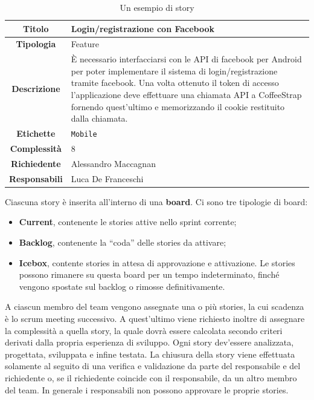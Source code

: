 \begin{center}
\begin{table}[htpd]
  \begin{tabularx}{\textwidth}{ | c | X |}
    \hline
    \textbf{Titolo} & Login/registrazione con Facebook \\
    \hline
    \textbf{Tipologia} & Feature \\
    \hline
    \textbf{Descrizione} & È necessario interfacciarsi con le API di facebook per Android per poter implementare il sistema di login/registrazione tramite facebook. Una volta ottenuto il token di accesso l'applicazione deve effettuare una chiamata API a CoffeeStrap fornendo quest'ultimo e memorizzando il cookie restituito dalla chiamata. \\
    \hline
    \textbf{Etichette} & \texttt{Mobile} \\
    \hline
    \textbf{Complessità} & 8 \\
    \hline
    \textbf{Richiedente} & Alessandro Maccagnan \\
    \hline
    \textbf{Responsabili} & Luca De Franceschi \\
    \hline
  \end{tabularx}
  \caption{Un esempio di story}
 \end{table}
\end{center}

Ciascuna story è inserita all'interno di una \textbf{board}. Ci sono tre tipologie di board:

\begin{itemize}

\item \textbf{Current}, contenente le stories attive nello sprint corrente;
\item \textbf{Backlog}, contenente la ``coda'' delle stories da attivare;
\item \textbf{Icebox}, contente stories in attesa di approvazione e attivazione. Le stories possono rimanere su questa board per un tempo indeterminato, finché vengono spostate sul backlog o rimosse definitivamente.

\end{itemize} 

A ciascun membro del team vengono assegnate una o più stories, la cui scadenza è lo scrum meeting successivo. A quest'ultimo viene richiesto inoltre di assegnare la complessità a quella story, la quale dovrà essere calcolata secondo criteri derivati dalla propria esperienza di sviluppo. Ogni story dev'essere analizzata, progettata, sviluppata e infine testata. La chiusura della story viene effettuata solamente al seguito di una verifica e validazione da parte del responsabile e del richiedente o, se il richiedente coincide con il responsabile, da un altro membro del team. In generale i responsabili non possono approvare le proprie stories.

